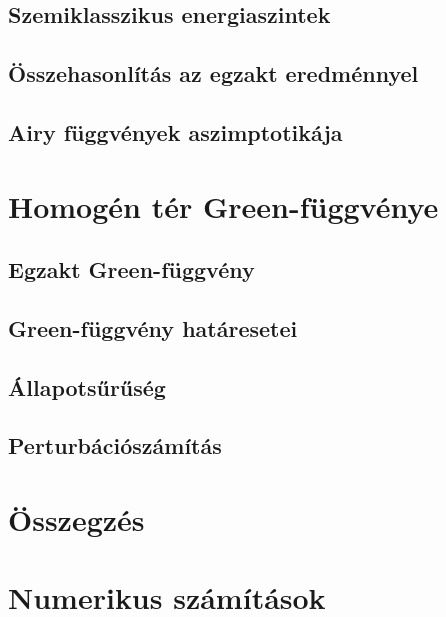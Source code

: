 \documentclass[pdftex,12pt,a4paper]{article}
\begin{document}
	\subsection{Szemiklasszikus energiaszintek}
		
	\subsection{Összehasonlítás az egzakt eredménnyel}
		
	\subsection{Airy függvények aszimptotikája}
		
\section{Homogén tér Green-függvénye}
	
	\subsection{Egzakt Green-függvény}
		
	\subsection{Green-függvény határesetei}
		
	\subsection{Állapotsűrűség}
		
	\subsection{Perturbációszámítás}
		
\section{Összegzés}
	
\appendix
%	
\section{Numerikus számítások}
	
	
    \newpage
	
    
\end{document}
